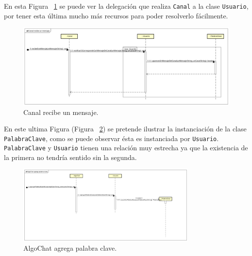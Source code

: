 \documentclass[titlepage,a4paper]{article}
\begin{document}
En esta Figura ~\ref{fig:seq03} se puede ver la delegación que realiza \verb|Canal| a la clase \verb|Usuario|, por tener esta última mucho más recursos para poder resolverlo fácilmente.
\begin{figure}[H]
\centering
\includegraphics[width=\textwidth]{Canal_recibe_un_mensaje.png}
\caption{\label{fig:seq03}Canal recibe un mensaje.}
\end{figure}
En este ultima Figura (Figura ~\ref{fig:seq04}) se pretende ilustrar la instanciación de la clase \verb|PalabraClave|, como se puede observar ésta es instanciada por \verb|Usuario|.\\\verb|PalabraClave| y \verb|Usuario| tienen una relación muy estrecha ya que la existencia de la primera no tendría sentido sin la segunda.
\begin{figure}[H]
\centering
\includegraphics[width=0.8\textwidth]{AlgoChat_agrega_palabra_clave.png}
\caption{\label{fig:seq04}AlgoChat agrega palabra clave.}
\end{figure}
\end{document}

